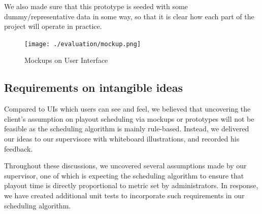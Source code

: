 \documentclass[a4paper]{article}
\begin{document}
We also made sure that this prototype is seeded with some dummy/representative data in some way, so that it is clear how each part of the project will operate in practice.

\begin{figure}[H]
   \begin{center}
      \texttt{[image: ./evaluation/mockup.png]}
   \end{center}
   \caption{Mockups on User Interface}
   \label{fig:mockup}
\end{figure}

\subsection{Requirements on intangible ideas}

Compared to UIs which users can see and feel, we believed that uncovering the client's assumption on playout scheduling via mockups or prototypes will not be feasible as the scheduling algorithm is mainly rule-based. Instead, we delivered our ideas to our supervisore with whiteboard illustrations, and recorded his feedback.

Throughout these discussions, we uncovered several assumptions made by our supervisor, one of which is expecting the scheduling algorithm to ensure that playout time is directly proportional to metric set by administrators. In response, we have created additional unit tests to incorporate such requirements in our scheduling algorithm.
\end{document}
